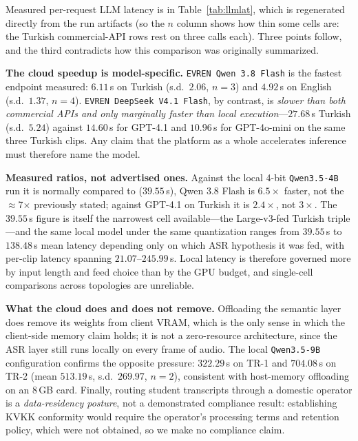 \documentclass[conference]{IEEEtran}
\begin{document}


Measured per-request LLM latency is in Table~\ref{tab:llmlat}, which is regenerated directly from the run artifacts (so the $n$ column shows how thin some cells are: the Turkish commercial-API rows rest on three calls each). Three points follow, and the third contradicts how this comparison was originally summarized.

\textbf{The cloud speedup is model-specific.} \texttt{EVREN Qwen 3.8 Flash} is the fastest endpoint measured: $6.11$\,s on Turkish (s.d.\ $2.06$, $n=3$) and $4.92$\,s on English (s.d.\ $1.37$, $n=4$). \texttt{EVREN DeepSeek V4.1 Flash}, by contrast, is \emph{slower than both commercial APIs and only marginally faster than local execution}---$27.68$\,s Turkish (s.d.\ $5.24$) against $14.60$\,s for GPT-4.1 and $10.96$\,s for GPT-4o-mini on the same three Turkish clips. Any claim that the platform as a whole accelerates inference must therefore name the model.

\textbf{Measured ratios, not advertised ones.} Against the local 4-bit \texttt{Qwen3.5-4B} run it is normally compared to ($39.55$\,s), Qwen 3.8 Flash is $6.5\times$ faster, not the $\approx$7$\times$ previously stated; against GPT-4.1 on Turkish it is $2.4\times$, not $3\times$. The $39.55$\,s figure is itself the narrowest cell available---the Large-v3-fed Turkish triple---and the same local model under the same quantization ranges from $39.55$\,s to $138.48$\,s mean latency depending only on which ASR hypothesis it was fed, with per-clip latency spanning $21.07$--$245.99$\,s. Local latency is therefore governed more by input length and feed choice than by the GPU budget, and single-cell comparisons across topologies are unreliable.

\textbf{What the cloud does and does not remove.} Offloading the semantic layer does remove its weights from client VRAM, which is the only sense in which the client-side memory claim holds; it is not a zero-resource architecture, since the ASR layer still runs locally on every frame of audio. The local \texttt{Qwen3.5-9B} configuration confirms the opposite pressure: $322.29$\,s on TR-1 and $704.08$\,s on TR-2 (mean $513.19$\,s, s.d.\ $269.97$, $n=2$), consistent with host-memory offloading on an 8\,GB card. Finally, routing student transcripts through a domestic operator is a \emph{data-residency posture}, not a demonstrated compliance result: establishing KVKK conformity would require the operator's processing terms and retention policy, which were not obtained, so we make no compliance claim.
\end{document}

